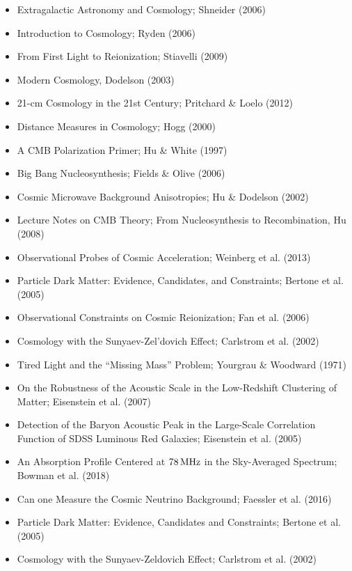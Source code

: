 \documentclass[a4paper,11pt]{article}
\begin{document}
\begin{itemize}
    \item Extragalactic Astronomy and Cosmology; Shneider (2006)
    \item Introduction to Cosmology; Ryden (2006)
    \item From First Light to Reionization; Stiavelli (2009)
    \item Modern Cosmology, Dodelson (2003)
    \item 21-cm Cosmology in the 21st Century; Pritchard \& Loelo (2012)
    \item Distance Measures in Cosmology; Hogg (2000)
    \item A CMB Polarization Primer; Hu \& White (1997)
    \item Big Bang Nucleosynthesis; Fields \& Olive (2006)
    \item Cosmic Microwave Background Anisotropies; Hu \& Dodelson (2002)
    \item Lecture Notes on CMB Theory; From Nucleosynthesis to Recombination, Hu (2008)
    \item Observational Probes of Cosmic Acceleration; Weinberg et al. (2013)
    \item Particle Dark Matter: Evidence, Candidates, and Constraints; Bertone et al. (2005)
    \item Observational Constraints on Cosmic Reionization; Fan et al. (2006)
    \item Cosmology with the Sunyaev-Zel'dovich Effect; Carlstrom et al. (2002)
    \item Tired Light and the ``Missing Mass'' Problem; Yourgrau \& Woodward (1971)
    \item On the Robustness of the Acoustic Scale in the Low-Redshift Clustering of Matter; Eisenstein et al. (2007)
    \item Detection of the Baryon Acoustic Peak in the Large-Scale Correlation Function of SDSS Luminous Red Galaxies; Eisenstein et al. (2005)
    \item An Absorption Profile Centered at $78\,{\rm MHz}$ in the Sky-Averaged Spectrum; Bowman et al. (2018)
    \item Can one Measure the Cosmic Neutrino Background; Faessler et al. (2016)
    \item Particle Dark Matter: Evidence, Candidates and Constraints; Bertone et al. (2005)
    \item Cosmology with the Sunyaev-Zeldovich Effect; Carlstrom et al. (2002)
\end{itemize}
\end{document}

